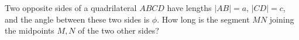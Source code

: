 Two opposite sides of a quadrilateral $ABCD$ have lengths $|AB| = a$, $|CD| = c$, and the angle between these two sides is $\phi$. How long is the segment $MN$ joining the midpoints $M, N$ of the two other sides?
